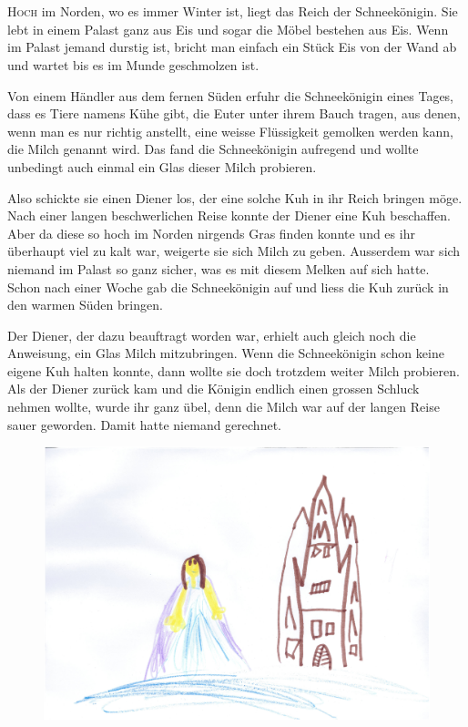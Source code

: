 \chapter*{}
\lettrine[lines=3]{\color{red}H}{och} im Norden, wo es immer Winter ist, liegt das Reich der Schneekönigin. Sie lebt in einem Palast ganz aus Eis und sogar die Möbel bestehen aus Eis. Wenn im Palast jemand durstig ist, bricht man einfach ein Stück Eis von der Wand ab und wartet bis es im Munde geschmolzen ist.

Von einem Händler aus dem fernen Süden erfuhr die Schneekönigin eines Tages, dass es Tiere namens Kühe gibt, die Euter unter ihrem Bauch tragen, aus denen, wenn man es nur richtig anstellt, eine weisse Flüssigkeit gemolken werden kann, die Milch genannt wird. Das fand die Schneekönigin aufregend und wollte unbedingt auch einmal ein Glas dieser Milch probieren.

Also schickte sie einen Diener los, der eine solche Kuh in ihr Reich bringen möge. Nach einer langen beschwerlichen Reise konnte der Diener eine Kuh beschaffen. Aber da diese so hoch im Norden nirgends Gras finden konnte und es ihr überhaupt viel zu kalt war, weigerte sie sich Milch zu geben. Ausserdem war sich niemand im Palast so ganz sicher, was es mit diesem Melken auf sich hatte. Schon nach einer Woche gab die Schneekönigin auf und liess die Kuh zurück in den warmen Süden bringen.

Der Diener, der dazu beauftragt worden war, erhielt auch gleich noch die Anweisung, ein Glas Milch mitzubringen. Wenn die Schneekönigin schon keine eigene Kuh halten konnte, dann wollte sie doch trotzdem weiter Milch probieren. Als der Diener zurück kam und die Königin endlich einen grossen Schluck nehmen wollte, wurde ihr ganz übel, denn die Milch war auf der langen Reise sauer geworden. Damit hatte niemand gerechnet. 
\begin{figure}[ht]
\centering
\includegraphics[width=\textwidth]{bilder/schneekoenigin.pdf}
\end{figure}

